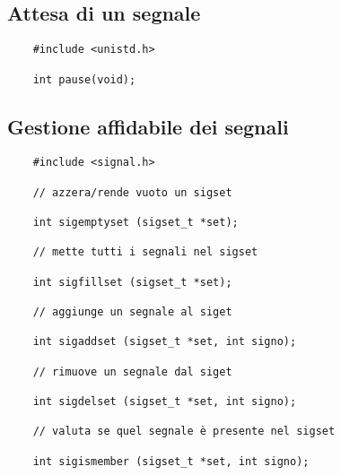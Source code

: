 \documentclass[italian,12pt,a4paper]{article}
\begin{document}
\subsection{Attesa di un segnale}
\begin{verbatim}
	#include <unistd.h>
	
	int pause(void);
\end{verbatim}
\subsection{Gestione affidabile dei segnali}
\begin{verbatim}
	#include <signal.h>
	
	// azzera/rende vuoto un sigset
	
	int sigemptyset (sigset_t *set); 
	
	// mette tutti i segnali nel sigset
	
	int sigfillset (sigset_t *set);
	
	// aggiunge un segnale al siget
	
	int sigaddset (sigset_t *set, int signo);
	
	// rimuove un segnale dal siget
	
	int sigdelset (sigset_t *set, int signo);
	
	// valuta se quel segnale è presente nel sigset
	
	int sigismember (sigset_t *set, int signo);
	
\end{verbatim}
\end{document}
